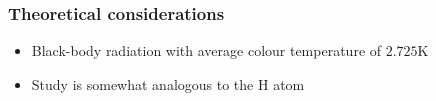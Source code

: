 \begin{frame}
\frametitle{Theoretical considerations}

\begin{itemize}
	\item Black-body radiation  with average colour temperature of $2.725 \mathrm{K}$
	\item Study is somewhat analogous to the H atom
\end{itemize}

\end{frame}